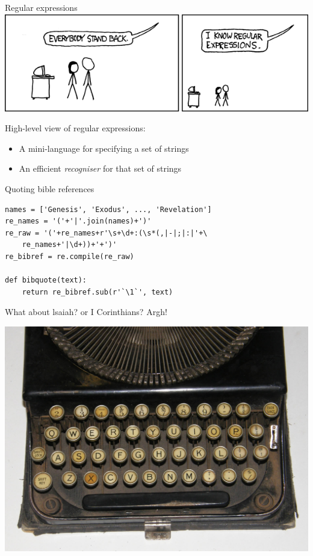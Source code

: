 \documentclass{beamer}
\begin{document}
\begin{frame}{Regular expressions}
    \includegraphics[keepaspectratio=true, width=0.9\paperwidth]{regular_expressions.png}

High-level view of regular expressions:
\begin{itemize}
\item A mini-language for specifying a set of strings
\item An efficient \emph{recogniser} for that set of strings
\end{itemize}

\end{frame}



\begin{frame}[fragile]{Quoting bible references}
    
\begin{verbatim}
names = ['Genesis', 'Exodus', ..., 'Revelation']
re_names = '('+'|'.join(names)+')'
re_raw = '('+re_names+r'\s+\d+:(\s*(,|-|;|:|'+\
    re_names+'|\d+))+'+')'
re_bibref = re.compile(re_raw)

def bibquote(text):
    return re_bibref.sub(r'`\1`', text)
\end{verbatim}

\vspace{1cm}

What about lsaiah? or I Corinthians? Argh!

\end{frame}

\begin{frame}%
    \centerline{\includegraphics[keepaspectratio=true, width=\paperwidth]{typewriter_keyboard.jpg}}
\end{frame}
\end{document}
